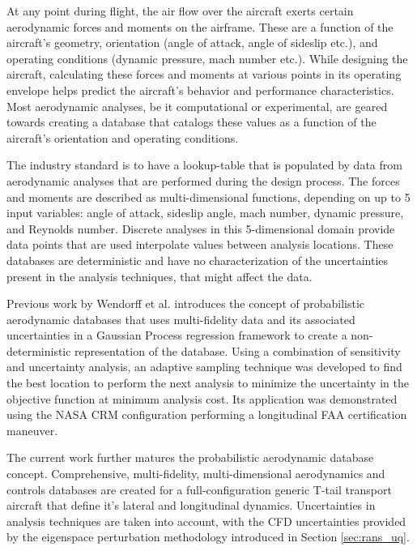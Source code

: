 At any point during flight, the air flow over the aircraft exerts certain aerodynamic forces and moments on the airframe. These are a function of the aircraft's geometry, orientation (angle of attack, angle of sideslip etc.), and operating conditions (dynamic pressure, mach number etc.). While designing the aircraft, calculating these forces and moments at various points in its operating envelope helps predict the aircraft's behavior and performance characteristics. Most aerodynamic analyses, be it computational or experimental, are geared towards creating a database that catalogs these values as a function of the aircraft's orientation and operating conditions.

The industry standard is to have a lookup-table that is populated by data from aerodynamic analyses that are performed during the design process. The forces and moments are described as multi-dimensional functions, depending on up to 5 input variables: angle of attack, sideslip angle, mach number, dynamic pressure, and Reynolds number. Discrete analyses in this 5-dimensional domain provide data points that are used interpolate values between analysis locations. These databases are deterministic and have no characterization of the uncertainties present in the analysis techniques, that might affect the data. 

Previous work by Wendorff et al. \cite{wendorff_combining_2016} introduces the concept of probabilistic aerodynamic databases that uses multi-fidelity data and its associated uncertainties in a Gaussian Process regression framework to create a non-deterministic representation of the database. Using a combination of sensitivity and uncertainty analysis, an adaptive sampling technique was developed to find the best location to perform the next analysis to minimize the uncertainty in the objective function at minimum analysis cost. Its application was demonstrated using the NASA CRM configuration performing a longitudinal FAA certification maneuver. 

The current work further matures the probabilistic aerodynamic database concept. Comprehensive, multi-fidelity, multi-dimensional aerodynamics and controls databases are created for a full-configuration generic T-tail transport aircraft that define it's lateral and longitudinal dynamics. Uncertainties in analysis techniques are taken into account, with the CFD uncertainties provided by the eigenspace perturbation methodology introduced in Section \ref{sec:rans_uq}.

